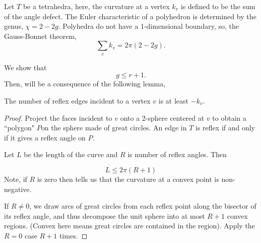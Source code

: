 Let $T$ be a tetrahedra, here, the curvature at a vertex $k_v$ is defined to
be the sum of the angle defect.
The Euler characteristic of a polyhedron is determined by the genus,
$\chi=2-2g$.
Polyhedra do not have a 1-dimensional boundary, 
so, the Gauss-Bonnet theorem,
$$\sum_vk_v=2\pi (2-2g).$$

We show that
$$g\leq r+1.$$ 
Then,  will be a consequence of the following
lemma,

\begin{lemma}\label{lem:reflex-edge}
The number of reflex edges  incident to a vertex $v$  is at least $-k_v.$
\end{lemma}

\begin{proof}
Project the faces incident to $v$ onto a 2-sphere centered at $v$
to obtain a ``polygon" $P$on the sphere made  of great circles.
An edge in $T$ is reflex if and only if it gives  a reflex angle on $P$.

Let $L$ be the length of the curve and $R$ is  number of reflex  angles.
Then

\begin{equation} \label{eqn:length-reflex}
L\leq 2\pi (R+1)
\end{equation}
Note, if $R$ is zero then 
tells us that the curvature at a convex point is non-negative.

If $R\neq 0$, we draw arcs of great circles from each reflex point
along the bisector of its reflex angle, and thus decompose the unit sphere
into at most $R+1$ convex regions. (Convex here means
great circles are contained in the region).
Apply the $R=0$ case $R+1$ times.

\end{proof}



